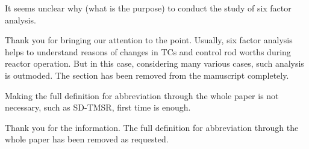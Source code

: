 \documentclass[answers,11pt]{exam}
\begin{document}
\begin{questions}
        \question It seems unclear why (what is the purpose) to conduct the study of six factor analysis.
        \begin{solution}
                 Thank you for bringing our attention to the point. Usually, 
                 six factor analysis helps to understand reasons of changes in 
                 TCs and control rod worths during reactor operation. But in 
                 this case, considering many various cases, such analysis is 
                 outmoded.           
                  The section has been removed from the manuscript completely.
        \end{solution}

        \question Making the full definition for abbreviation through the whole paper is not necessary, such as SD-TMSR, first time is enough.
        
        \begin{solution}
                Thank you for the information. The full definition for abbreviation through the whole paper has been removed as requested.
        \end{solution}


        
        
\end{questions}


\end{document}
